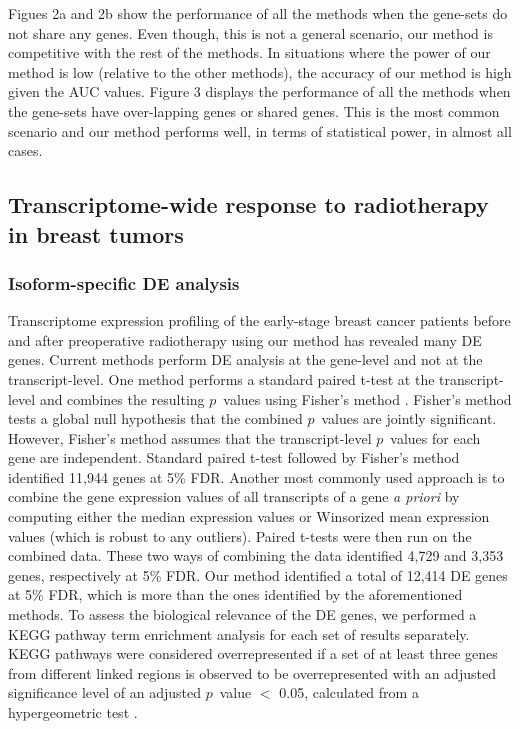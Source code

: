 \documentclass[hidelinks,11pt]{article}
\begin{document}
Figues 2a and 2b show the performance of all the methods when the gene-sets do not share any genes. Even though, this is not a general scenario, our method is competitive with the rest of the methods. In situations where the power of our method is low (relative to the other methods), the accuracy of our method is high given the AUC values. Figure 3 displays the performance of all the methods when the gene-sets have over-lapping genes or shared genes. This is the most common scenario and our method performs well, in terms of statistical power, in almost all cases. 

\subsection*{Transcriptome-wide response to radiotherapy in breast tumors}

\subsubsection*{Isoform-specific DE analysis}

Transcriptome expression profiling of the early-stage breast cancer patients before and after preoperative radiotherapy using our method has revealed many DE genes. Current methods perform DE analysis at the gene-level and not at the transcript-level. One method performs a standard paired t-test at the transcript-level and combines the resulting $p$~values using Fisher's method \cite{fisher,birnbaum}. Fisher's method tests a global null hypothesis that the combined $p$~values are jointly significant. However, Fisher's method assumes that the transcript-level $p$~values for each gene are independent. Standard paired t-test followed by Fisher's method identified 11,944 genes at 5\% FDR. Another most commonly used approach is to combine the gene expression values of all transcripts of a gene \emph{a priori} by computing either the median expression values or Winsorized mean expression values (which is robust to any outliers). Paired t-tests were then run on the combined data. These two ways of combining the data identified 4,729 and 3,353 genes, respectively at 5\% FDR. Our method identified a total of 12,414 DE genes at 5\% FDR, which is more than the ones identified by the aforementioned methods. To assess the biological relevance of the DE genes, we performed a KEGG pathway term enrichment analysis \cite{kegg} for each set of results separately.  KEGG pathways were considered overrepresented if a set of at least three genes from different linked regions is observed to be overrepresented with an adjusted significance level of an adjusted $p$~value $<$ 0.05, calculated from a hypergeometric test \cite{clusterProfiler}.  
\end{document}
